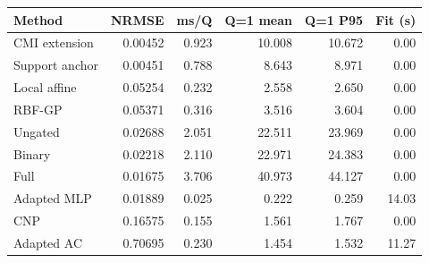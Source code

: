\begin{tabular}{lrrrrr}\toprule
Method & NRMSE & ms/Q & Q=1 mean & Q=1 P95 & Fit (s)\\\midrule
CMI extension & 0.00452 & 0.923 & 10.008 & 10.672 & 0.00\\
Support anchor & 0.00451 & 0.788 & 8.643 & 8.971 & 0.00\\
Local affine & 0.05254 & 0.232 & 2.558 & 2.650 & 0.00\\
RBF-GP & 0.05371 & 0.316 & 3.516 & 3.604 & 0.00\\
Ungated & 0.02688 & 2.051 & 22.511 & 23.969 & 0.00\\
Binary & 0.02218 & 2.110 & 22.971 & 24.383 & 0.00\\
Full & 0.01675 & 3.706 & 40.973 & 44.127 & 0.00\\
Adapted MLP & 0.01889 & 0.025 & 0.222 & 0.259 & 14.03\\
CNP & 0.16575 & 0.155 & 1.561 & 1.767 & 0.00\\
Adapted AC & 0.70695 & 0.230 & 1.454 & 1.532 & 11.27\\
\bottomrule\end{tabular}
